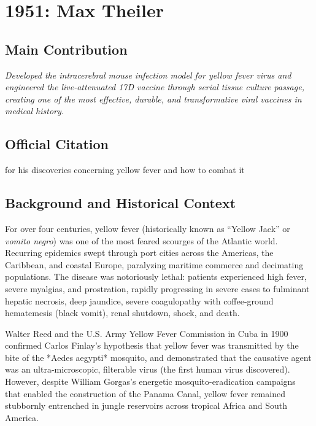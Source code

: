 \chapter[1951 --- Theiler]{1951: Max Theiler}
\label{ch:1951_maxtheiler}

\section*{Main Contribution}

\textit{Developed the intracerebral mouse infection model for yellow fever virus and engineered the live-attenuated 17D vaccine through serial tissue culture passage, creating one of the most effective, durable, and transformative viral vaccines in medical history.}\cite{nobel-1951,lecture-1951,theiler-classic-1937,nature-yellow-fever}

\section{Official Citation}

for his discoveries concerning yellow fever and how to combat it

\section{Background and Historical Context}

For over four centuries, yellow fever (historically known as ``Yellow Jack'' or \emph{vomito negro}) was one of the most feared scourges of the Atlantic world. Recurring epidemics swept through port cities across the Americas, the Caribbean, and coastal Europe, paralyzing maritime commerce and decimating populations. The disease was notoriously lethal: patients experienced high fever, severe myalgias, and prostration, rapidly progressing in severe cases to fulminant hepatic necrosis, deep jaundice, severe coagulopathy with coffee-ground hematemesis (black vomit), renal shutdown, shock, and death.

Walter Reed and the U.S. Army Yellow Fever Commission in Cuba in 1900 confirmed Carlos Finlay's hypothesis that yellow fever was transmitted by the bite of the *Aedes aegypti* mosquito, and demonstrated that the causative agent was an ultra-microscopic, filterable virus (the first human virus discovered). However, despite William Gorgas's energetic mosquito-eradication campaigns that enabled the construction of the Panama Canal, yellow fever remained stubbornly entrenched in jungle reservoirs across tropical Africa and South America.

